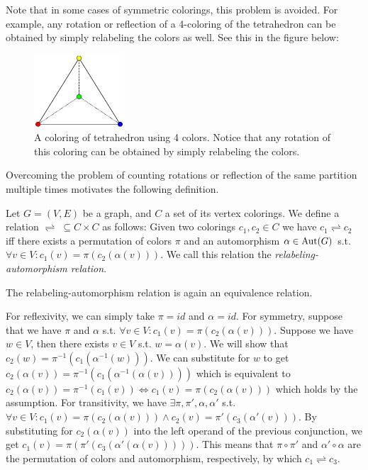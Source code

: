 Note that in some cases of symmetric colorings, this problem is avoided. For example, any rotation or reflection of a 4-coloring of the tetrahedron can be obtained by simply relabeling the colors as well. See this in the figure below:

\begin{figure}[H]
    \centering
    \includegraphics[width=0.3\textwidth]{Resources/Figs/example-tetrahedron-4-clring.pdf}
    \caption{A coloring of tetrahedron using 4 colors. Notice that any rotation of this coloring can be obtained by simply relabeling the colors.}
    \label{fig:example-tetrahedron-4-coloring}
\end{figure}

Overcoming the problem of counting rotations or reflection of the same partition multiple times motivates the following definition.

\begin{defn}\label{dfn:relabeling-automorphism-relation}
    Let $G=(V,E)$ be a graph, and $C$ a set of its vertex colorings. We define a relation $\rightleftharpoons \; \subseteq C \times C$ as follows: Given two colorings $c_1,c_2 \in C$ we have $c_1 \rightleftharpoons c_2$ iff there exists a permutation of colors $\pi$ and an automorphism $\alpha \in \operatorname{Aut}(G)$ s.t. $\forall v \in V : c_1(v) = \pi(c_2(\alpha(v)))$. We call this relation the \emph{relabeling-automorphism relation}.
\end{defn}

The relabeling-automorphism relation is again an equivalence relation. 

For reflexivity, we can simply take $\pi = id$ and $\alpha = id$. For symmetry, suppose that we have $\pi$ and $\alpha$ s.t. $\forall v \in V : c_1(v) = \pi(c_2(\alpha(v)))$. Suppose we have $w \in V$, then there exists $v \in V$ s.t. $w = \alpha(v)$. We will show that $c_2(w) = \pi^{-1}(c_1(\alpha^{-1}(w)))$. We can substitute for $w$ to get $c_2(\alpha(v)) = \pi^{-1}(c_1(\alpha^{-1}(\alpha(v))))$ which is equivalent to $c_2(\alpha(v)) = \pi^{-1}(c_1(v)) \iff c_1(v) = \pi(c_2(\alpha(v)))$ which holds by the assumption. For transitivity, we have $\exists \pi, \pi', \alpha ,\alpha'$ s.t. $\forall v \in V : c_1(v) = \pi(c_2(\alpha(v))) \wedge c_2(v) = \pi'(c_3(\alpha'(v)))$. By substituting for $c_2(\alpha(v))$ into the left operand of the previous conjunction, we get $c_1(v)=\pi(\pi'(c_3(\alpha'(\alpha(v)))))$. This means that $\pi \circ \pi'$ and $\alpha' \circ \alpha$ are the permutation of colors and automorphism, respectively, by which $c_1 \rightleftharpoons c_3$.

